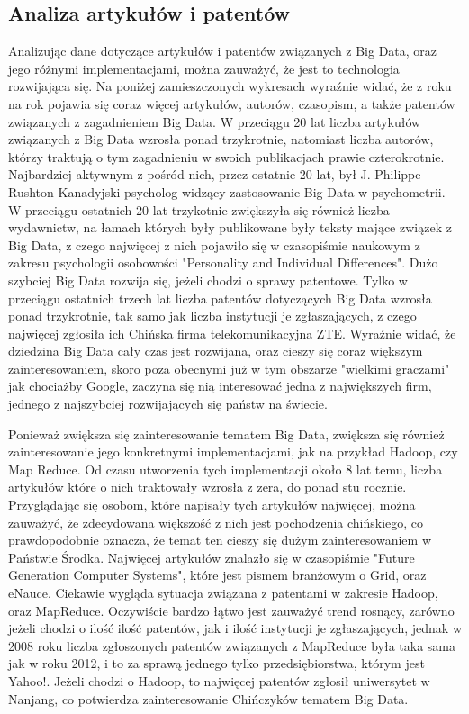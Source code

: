 \subsection{Analiza artykułów i patentów}
\label{sub:analiza_artykulow}
Analizując dane dotyczące artykułów i patentów związanych z Big Data, oraz jego różnymi implementacjami, można zauważyć, że jest to technologia rozwijająca się. Na poniżej zamieszczonych wykresach wyraźnie widać, że z roku na rok pojawia się coraz więcej artykułów, autorów, czasopism, a także patentów związanych z zagadnieniem Big Data. W przeciągu 20 lat liczba artykułów związanych z Big Data wzrosła ponad trzykrotnie, natomiast liczba autorów, którzy traktują o tym zagadnieniu w swoich publikacjach prawie czterokrotnie. Najbardziej aktywnym z pośród nich, przez ostatnie 20 lat, był J. Philippe Rushton Kanadyjski psycholog widzący zastosowanie Big Data w psychometrii. W przeciągu ostatnich 20 lat trzykotnie zwiększyła się również liczba wydawnictw, na łamach których były publikowane były teksty mające związek z Big Data, z czego najwięcej z nich pojawiło się w czasopiśmie naukowym z zakresu psychologii osobowości "Personality and Individual Differences". Dużo szybciej Big Data rozwija się, jeżeli chodzi o sprawy patentowe. Tylko w przeciągu ostatnich trzech lat liczba patentów dotyczących Big Data wzrosła ponad trzykrotnie, tak samo jak liczba instytucji je zgłaszających, z czego najwięcej zgłosiła ich Chińska firma telekomunikacyjna ZTE. Wyraźnie widać, że dziedzina Big Data cały czas jest rozwijana, oraz cieszy się coraz większym zainteresowaniem, skoro poza obecnymi już w tym obszarze "wielkimi graczami" jak chociażby Google, zaczyna się nią interesować jedna z największych firm, jednego z najszybciej rozwijających się państw na świecie.

Ponieważ zwiększa się zainteresowanie tematem Big Data, zwiększa się również zainteresowanie jego konkretnymi implementacjami, jak na przykład Hadoop, czy Map Reduce. Od czasu utworzenia tych implementacji około 8 lat temu, liczba artykułów które o nich traktowały wzrosła z zera, do ponad stu rocznie. Przyglądając się osobom, które napisały tych artykułów najwięcej, można zauważyć, że zdecydowana większość z nich jest pochodzenia chińskiego, co prawdopodobnie oznacza, że temat ten cieszy się dużym zainteresowaniem w Państwie Środka. Najwięcej artykułów znalazło się w czasopiśmie "Future Generation Computer Systems", które jest pismem branżowym o Grid, oraz eNauce. Ciekawie wygląda sytuacja związana z patentami w zakresie Hadoop, oraz MapReduce. Oczywiście bardzo łątwo jest zauważyć trend rosnący, zarówno jeżeli chodzi o ilość ilość patentów, jak i ilość instytucji je zgłaszających, jednak w 2008 roku liczba zgłoszonych patentów związanych z MapReduce była taka sama jak w roku 2012, i to za sprawą jednego tylko przedsiębiorstwa, którym jest Yahoo!. Jeżeli chodzi o Hadoop, to najwięcej patentów zgłosił uniwersytet w Nanjang, co potwierdza zainteresowanie Chińczyków tematem Big Data.

